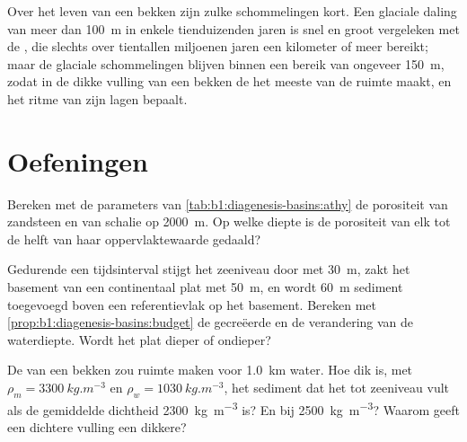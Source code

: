 Over het leven van een bekken zijn zulke schommelingen kort. Een glaciale daling van meer dan \qty{100}{m} in enkele tienduizenden jaren is snel en groot vergeleken met de , die slechts over tientallen miljoenen jaren een kilometer of meer bereikt; maar de glaciale schommelingen blijven binnen een bereik van ongeveer \qty{150}{m}, zodat in de dikke vulling van een bekken de  het meeste van de ruimte maakt, en  het ritme van zijn lagen bepaalt.

\section{Oefeningen}

\begin{exercise}[$\star$]\label{exo:b1:diagenesis-basins:1}
Bereken met de parameters van \cref{tab:b1:diagenesis-basins:athy} de porositeit van zandsteen en van schalie op \qty{2000}{m}. Op welke diepte is de porositeit van elk tot de helft van haar oppervlaktewaarde gedaald?
\end{exercise}

\begin{exercise}[$\star$]\label{exo:b1:diagenesis-basins:2}
Gedurende een tijdsinterval stijgt het zeeniveau door  met \qty{30}{m}, zakt het basement van een continentaal plat met \qty{50}{m}, en wordt \qty{60}{m} sediment toegevoegd boven een referentievlak op het basement. Bereken met \cref{prop:b1:diagenesis-basins:budget} de gecreëerde  en de verandering van de waterdiepte. Wordt het plat dieper of ondieper?
\end{exercise}

\begin{exercise}[$\star$]\label{exo:b1:diagenesis-basins:3}
De  van een bekken zou ruimte maken voor \qty{1.0}{km} water. Hoe dik is, met $\rho_m = \qty{3300}{kg.m^{-3}}$ en $\rho_w = \qty{1030}{kg.m^{-3}}$, het sediment dat het tot zeeniveau vult als de gemiddelde dichtheid \qty{2300}{kg.m^{-3}} is? En bij \qty{2500}{kg.m^{-3}}? Waarom geeft een dichtere vulling een dikkere?
\end{exercise}

